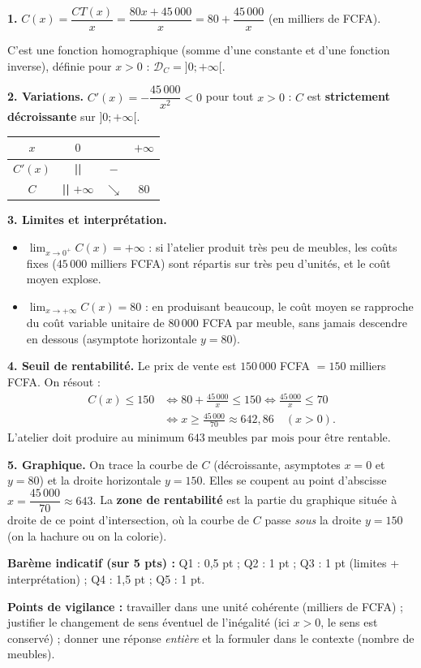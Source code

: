 \documentclass[11pt]{article}
\begin{document}
\begin{corrige}
\textbf{1.} $C(x)=\dfrac{CT(x)}{x}=\dfrac{80x+45\,000}{x}=80+\dfrac{45\,000}{x}$ (en milliers de FCFA).

C'est une fonction homographique (somme d'une constante et d'une fonction inverse), définie pour $x>0$ : $\mathcal{D}_C=]0;+\infty[$.

\textbf{2. Variations.} $C'(x)=-\dfrac{45\,000}{x^2}<0$ pour tout $x>0$ : $C$ est \textbf{strictement décroissante} sur $]0;+\infty[$.

\begin{center}
\begin{tabular}{|c|ccc|}\hline
$x$ & $0$ & & $+\infty$ \\ \hline
$C'(x)$ & \textbf{||} & $-$ & \\ \hline
$C$ & \textbf{||} $+\infty$ & $\searrow$ & $80$ \\ \hline
\end{tabular}
\end{center}

\textbf{3. Limites et interprétation.}
\begin{itemize}
    \item $\displaystyle\lim_{x\to 0^+}C(x)=+\infty$ : si l'atelier produit très peu de meubles, les coûts fixes ($45\,000$ milliers FCFA) sont répartis sur très peu d'unités, et le coût moyen explose.
    \item $\displaystyle\lim_{x\to+\infty}C(x)=80$ : en produisant beaucoup, le coût moyen se rapproche du coût variable unitaire de $80\,000$ FCFA par meuble, sans jamais descendre en dessous (asymptote horizontale $y=80$).
\end{itemize}

\textbf{4. Seuil de rentabilité.} Le prix de vente est $150\,000$ FCFA $=150$ milliers FCFA. On résout :
\begin{align*}
C(x)\le 150 &\iff 80+\frac{45\,000}{x}\le 150 \iff \frac{45\,000}{x}\le 70\\
&\iff x \ge \frac{45\,000}{70} \approx 642{,}86 \quad (x>0).
\end{align*}
L'atelier doit produire au minimum $\boxed{643\ \text{meubles par mois}}$ pour être rentable.

\textbf{5. Graphique.} On trace la courbe de $C$ (décroissante, asymptotes $x=0$ et $y=80$) et la droite horizontale $y=150$. Elles se coupent au point d'abscisse $x=\dfrac{45\,000}{70}\approx 643$. La \textbf{zone de rentabilité} est la partie du graphique située à droite de ce point d'intersection, où la courbe de $C$ passe \emph{sous} la droite $y=150$ (on la hachure ou on la colorie).

\textbf{Barème indicatif (sur 5 pts) :} Q1 : 0,5 pt ; Q2 : 1 pt ; Q3 : 1 pt (limites + interprétation) ; Q4 : 1,5 pt ; Q5 : 1 pt.

\textbf{Points de vigilance :} travailler dans une unité cohérente (milliers de FCFA) ; justifier le changement de sens éventuel de l'inégalité (ici $x>0$, le sens est conservé) ; donner une réponse \emph{entière} et la formuler dans le contexte (nombre de meubles).
\end{corrige}
\end{document}
